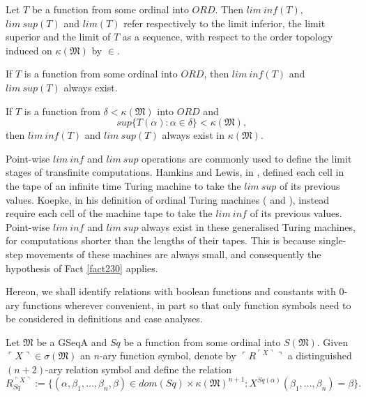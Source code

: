 \documentclass[12pt]{article}
\numberwithin{equation}{section}
\begin{document}
\begin{defi}
Let $T$ be a function from some ordinal into $ORD$. Then $lim \ inf (T)$, $lim \ sup (T)$ and $lim(T)$ refer respectively to the limit inferior, the limit superior and the limit of $T$ as a sequence, with respect to the order topology induced on $\kappa(\mathfrak{M})$ by $\in$.
\end{defi}

\begin{fact}
If $T$ is a function from some ordinal into $ORD$, then $lim \ inf (T)$ and $lim \ sup (T)$ always exist.
\end{fact}

\begin{fact}\label{fact230}
If $T$ is a function from $\delta < \kappa(\mathfrak{M})$ into $ORD$ and
\begin{equation*}
    sup \{T(\alpha) : \alpha \in \delta\} < \kappa(\mathfrak{M}) \text{,}
\end{equation*}
then $lim \ inf (T)$ and $lim \ sup (T)$ always exist in $\kappa(\mathfrak{M})$.
\end{fact}

Point-wise $lim \ inf$ and $lim \ sup$ operations are commonly used to define the limit stages of transfinite computations. Hamkins and Lewis, in \cite{ittm}, defined each cell in the tape of an infinite time Turing machine to take the $lim \ sup$ of its previous values. Koepke, in his definition of ordinal Turing machines (\cite{koepke1} and \cite{koepke2}), instead require each cell of the machine tape to take the $lim \ inf$ of its previous values. Point-wise $lim \ inf$ and $lim \ sup$ always exist in these generalised Turing machines, for computations shorter than the lengths of their tapes. This is because single-step movements of these machines are always small, and consequently the hypothesis of Fact \ref{fact230} applies.

Hereon, we shall identify relations with boolean functions and constants with $0$-ary functions wherever convenient, in part so that only function symbols need to be considered in definitions and case analyses. 

\begin{defi}
Let $\mathfrak{M}$ be a GSeqA and $Sq$ be a function from some ordinal into $S(\mathfrak{M})$. Given $\ulcorner X \urcorner \in \sigma(\mathfrak{M})$ an $n$-ary function symbol, denote by $\ulcorner R^{\ulcorner X \urcorner} \urcorner$ a distinguished $(n+2)$-ary relation symbol and define the relation 
\begin{equation*}
    R_{Sq}^{\ulcorner X \urcorner} := \{(\alpha, \beta_1, \dots, \beta_n, \beta) \in dom(Sq) \times \kappa(\mathfrak{M})^{n+1} : X^{Sq(\alpha)} (\beta_1, \dots, \beta_n) = \beta\} \text{.}
\end{equation*}
\end{defi}
\end{document}
